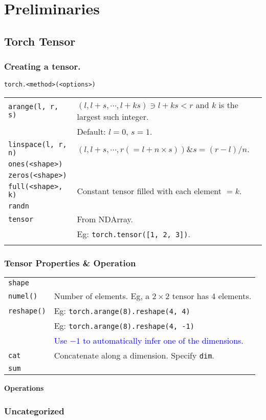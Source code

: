 \section{Preliminaries}

\subsection{Torch Tensor}

\subsubsection*{Creating a tensor.}
\texttt{torch.<method>(<options>)}\\
\begin{tabularx}{\linewidth}{lX}
    \hline
    \texttt{arange(l, r, s)}        & $(l, l+s, \cdots, l+ks) \ni l+ks < r$ and $k$ is the largest such integer.\\
                                    & Default: $l = 0$, $s = 1$.\\ 
    \texttt{linspace(l, r, n)}      & $(l, l+s, \cdots, r(= l + n\times s)) \& s = (r-l)/n$.\\
    \texttt{ones(<shape>)}          & \\ 
    \texttt{zeros(<shape>)}         & \\ 
    \texttt{full(<shape>, k)}       & Constant tensor filled with each element $= k$.\\ 
    \texttt{randn}                  & \\
    \hline
    \texttt{tensor}                 & From NDArray.\\
                                    & Eg: \texttt{torch.tensor([1, 2, 3])}.\\
    \hline
    \texttt{}
\end{tabularx}

\subsubsection{Tensor Properties \& Operation}

\begin{tabularx}{\linewidth}{lX}
    \hline
    \texttt{shape}      & \\
    \texttt{numel()}    & Number of elements. Eg, a $2 \times 2$ tensor has 4 elements.\\
    \texttt{reshape()}  & Eg: \texttt{torch.arange(8).reshape(4, 4)}\\
                        & Eg: \texttt{torch.arange(8).reshape(4, -1)}\\
                        & \textcolor{blue}{Use $-1$ to automatically infer one of the dimensions.}\\
    \hline
    \texttt{cat}        & Concatenate along a dimension. Specify \texttt{dim}.\\
    \texttt{sum}        & \\
\end{tabularx}

\textbf{Operations}\\



\subsubsection*{Uncategorized}

\begin{tabularx}{\linewidth}{lX}
    
\end{tabularx}